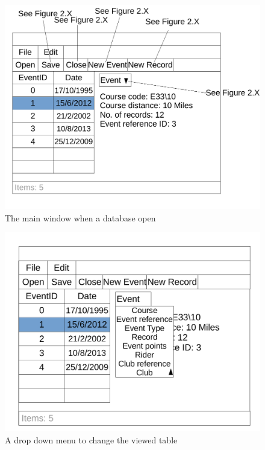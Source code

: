 \begin{figure}[H]
    	\includegraphics[width=\textwidth]{./UI Design/DatebaseMain1.pdf}
    	\caption{The main window when a database open} \label{fig:The main window when a database is open}
\end{figure}

\begin{figure}[H]
	\includegraphics[width=\textwidth]{./UI Design/DatebaseMainDropDown.pdf}
	\caption{A drop down menu to change the viewed table} \label{fig:A drop down menu to change the viewed table}
\end{figure}

